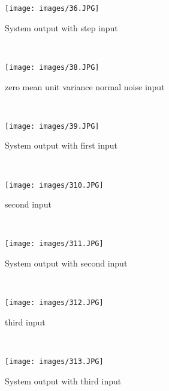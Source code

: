 \documentclass[11pt]{scrartcl} %
\begin{document}
\begin{figure}[H]
	\centering
	\texttt{[image: images/36.JPG]}
	\caption{System output with step input}
\end{figure}\\

\begin{figure}[H]
	\centering
	\texttt{[image: images/38.JPG]}
	\caption{zero mean unit variance normal noise input}
\end{figure}\\

\begin{figure}[H]
	\centering
	\texttt{[image: images/39.JPG]}
	\caption{System output  with  first input}
\end{figure}\\


\begin{figure}[H]
	\centering
	\texttt{[image: images/310.JPG]}
	\caption{second input}
\end{figure}\\

\begin{figure}[H]
	\centering
	\texttt{[image: images/311.JPG]}
	\caption{System output with second input}
\end{figure}\\

\begin{figure}[H]
	\centering
	\texttt{[image: images/312.JPG]}
	\caption{third input}
\end{figure}\\

\begin{figure}[H]
	\centering
	\texttt{[image: images/313.JPG]}
	\caption{System output with third input}
\end{figure}\\

\end{document}
